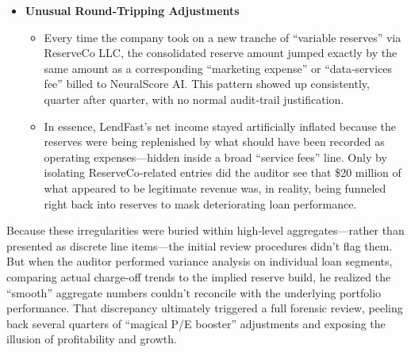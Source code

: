 \begin{itemize}[nosep]
    \item \textbf{Unusual Round‐Tripping Adjustments}
    \begin{itemize}[nosep]
        \item Every time the company took on a new tranche of “variable reserves” via ReserveCo LLC, the consolidated reserve amount jumped exactly by the same amount as a corresponding “marketing expense” or “data‐services fee” billed to NeuralScore AI. This pattern showed up consistently, quarter after quarter, with no normal audit‐trail justification.
        \item In essence, LendFast’s net income stayed artificially inflated because the reserves were being replenished by what should have been recorded as operating expenses—hidden inside a broad “service fees” line. Only by isolating ReserveCo‐related entries did the auditor see that \$20 million of what appeared to be legitimate revenue was, in reality, being funneled right back into reserves to mask deteriorating loan performance.
    \end{itemize}
\end{itemize}

Because these irregularities were buried within high‐level aggregates—rather than presented as discrete line items—the initial review procedures didn’t flag them. But when the auditor performed variance analysis on individual loan segments, comparing actual charge‐off trends to the implied reserve build, he realized the “smooth” aggregate numbers couldn’t reconcile with the underlying portfolio performance. That discrepancy ultimately triggered a full forensic review, peeling back several quarters of “magical P/E booster” adjustments and exposing the illusion of profitability and growth.

